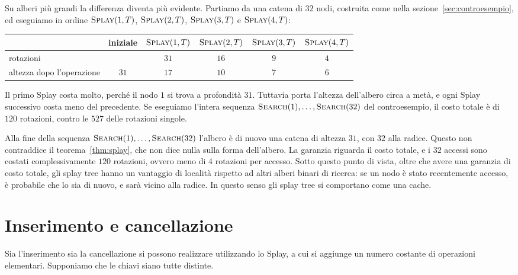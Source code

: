 Su alberi più grandi la differenza diventa più evidente. Partiamo da una catena di $32$ nodi, costruita come nella sezione~\ref{sec:controesempio}, ed eseguiamo in ordine $\textsc{Splay}(1,T)$, $\textsc{Splay}(2,T)$, $\textsc{Splay}(3,T)$ e $\textsc{Splay}(4,T)$:

\begin{center}
\small
\begin{tabular}{lccccc}
\toprule
 & iniziale & $\textsc{Splay}(1,T)$ & $\textsc{Splay}(2,T)$ & $\textsc{Splay}(3,T)$ & $\textsc{Splay}(4,T)$ \\
\midrule
rotazioni & & $31$ & $16$ & $9$ & $4$ \\
altezza dopo l'operazione & $31$ & $17$ & $10$ & $7$ & $6$ \\
\bottomrule
\end{tabular}
\end{center}

\noindent
Il primo Splay costa molto, perché il nodo $1$ si trova a profondità $31$. Tuttavia porta l'altezza dell'albero circa a metà, e ogni Splay successivo costa meno del precedente. Se eseguiamo l'intera sequenza $\textsc{Search}(1), \dots, \textsc{Search}(32)$ del controesempio, il costo totale è di $120$ rotazioni, contro le $527$ delle rotazioni singole.

\begin{osservazione}
Alla fine della sequenza $\textsc{Search}(1), \dots, \textsc{Search}(32)$ l'albero è di nuovo una catena di altezza $31$, con $32$ alla radice. Questo non contraddice il teorema~\ref{thm:splay}, che non dice nulla sulla forma dell'albero. La garanzia riguarda il costo totale, e i $32$ accessi sono costati complessivamente $120$ rotazioni, ovvero meno di $4$ rotazioni per accesso. Sotto questo punto di vista, oltre che avere una garanzia di costo totale, gli splay tree hanno un vantaggio di località rispetto ad altri alberi binari di ricerca: se un nodo è stato recentemente accesso, è probabile che lo sia di nuovo, e sarà vicino alla radice. In questo senso gli splay tree si comportano come una cache.
\end{osservazione}

\section{Inserimento e cancellazione}\label{sec:ins-del}
Sia l'inserimento sia la cancellazione si possono realizzare utilizzando lo Splay, a cui si aggiunge un numero costante di operazioni elementari. Supponiamo che le chiavi siano tutte distinte.

